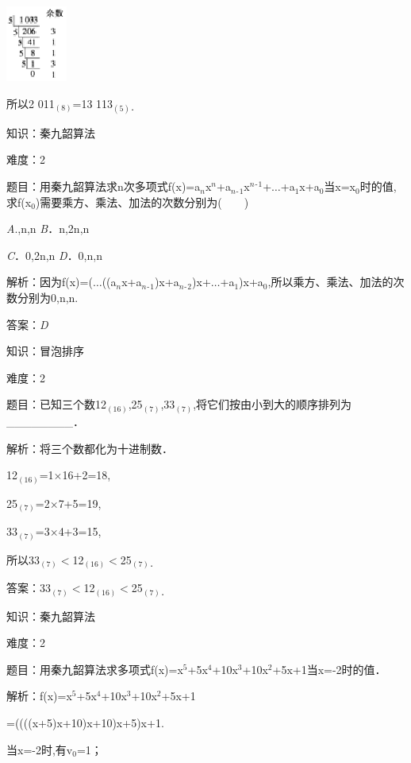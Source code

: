 \documentclass{article} %
\begin{document}
\includegraphics*[width=0.79in, height=0.98in, keepaspectratio=false]{image76}

所以2 011$_{(8)}$=13 113$_{(5)}$${}_{\textrm{．}}$



知识：秦九韶算法

难度：2

题目：用秦九韶算法求n次多项式f(x)=a${}_{n}$x${}^{n}$+a${}_{n}$${}_{\textrm{-}}$${}_{1}$x${}^{n}$${}^{\textrm{-}}$${}^{1}$+$\dots$+a${}_{1}$x+a${}_{0}$当x=x${}_{0}$时的值,求f(x${}_{0}$)需要乘方、乘法、加法的次数分别为(　　)

\textit{A}.,n,n  \textit{B}．n,2n,n

\textit{C}．0,2n,n  \textit{D}．0,n,n

解析：因为f(x)=($\dots$((a${}_{n}$x+a${}_{n}$${}_{\textrm{-}}$${}_{1}$)x+a${}_{n}$${}_{\textrm{-}}$${}_{2}$)x+$\dots$+a${}_{1}$)x+a${}_{0}$,所以乘方、乘法、加法的次数分别为0,n,n.

答案：\textit{D}

知识：冒泡排序

难度：2

题目：已知三个数12${}_{(16)}$,25${}_{(7)}$,33${}_{(7)}$,将它们按由小到大的顺序排列为\_\_\_\_\_\_\_\_．

解析：将三个数都化为十进制数．

12${}_{(16)}$=1$\mathrm{\times}$16+2=18,

25${}_{(7)}$=2$\mathrm{\times}$7+5=19,

33${}_{(7)}$=3$\mathrm{\times}$4+3=15,

所以33${}_{(7)}$$\mathrm{<}$12${}_{(16)}$$\mathrm{<}$25${}_{(7)}$${}_{\textrm{．}}$

答案：33${}_{(7)}$$\mathrm{<}$12${}_{(16)}$$\mathrm{<}$25${}_{(7)}$${}_{\textrm{．}}$

知识：秦九韶算法

难度：2

题目：用秦九韶算法求多项式f(x)=x${}^{5}$+5x${}^{4}$+10x${}^{3}$+10x${}^{2}$+5x+1当x=-2时的值．

解析：f(x)=x${}^{5}$+5x${}^{4}$+10x${}^{3}$+10x${}^{2}$+5x+1

=((((x+5)x+10)x+10)x+5)x+1.

当x=-2时,有v${}_{0}$=1；
\end{document}
